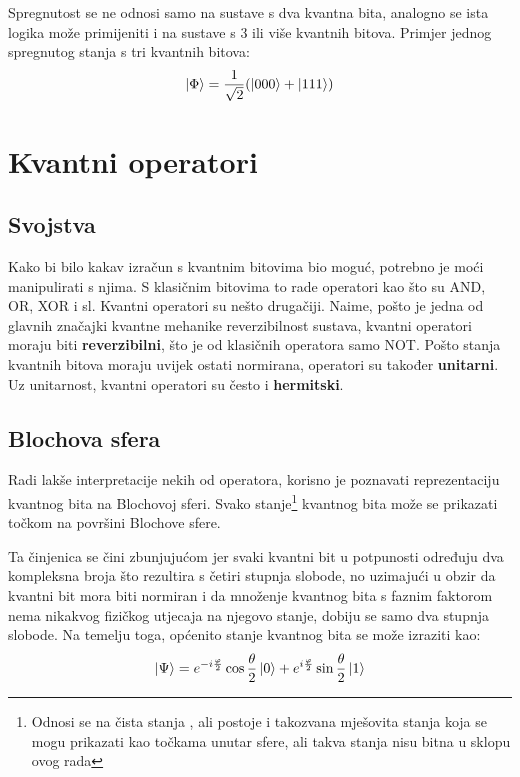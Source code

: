 Spregnutost se ne odnosi samo na sustave s dva kvantna bita, analogno se ista logika može primijeniti i na sustave s 3 ili više kvantnih bitova. Primjer jednog spregnutog stanja s tri kvantnih bitova:
\[
\ket{\Phi} = \frac{1}{\sqrt{2}}(\ket{000} + \ket{111})
\]




\section{Kvantni operatori}

\subsection{Svojstva}

Kako bi bilo kakav izračun s kvantnim bitovima bio moguć, potrebno je moći manipulirati s njima. S klasičnim bitovima to rade operatori kao što su AND, OR, XOR i sl. Kvantni operatori su nešto drugačiji. Naime, pošto je jedna od glavnih značajki kvantne mehanike reverzibilnost sustava, kvantni operatori moraju biti \textbf{reverzibilni}, što je od klasičnih operatora samo NOT. Pošto stanja kvantnih bitova moraju uvijek ostati normirana, operatori su također \textbf{unitarni}. Uz unitarnost, kvantni operatori su često i \textbf{hermitski}.

\subsection{Blochova sfera}

Radi lakše interpretacije nekih od operatora, korisno je poznavati reprezentaciju kvantnog bita na Blochovoj sferi. Svako stanje\footnote{Odnosi se na čista stanja , ali postoje i takozvana mješovita stanja koja se mogu prikazati kao točkama unutar sfere, ali takva stanja nisu bitna u sklopu ovog rada} kvantnog bita može se prikazati točkom na površini Blochove sfere.

Ta činjenica se čini zbunjujućom jer svaki kvantni bit u potpunosti određuju dva kompleksna broja što rezultira s četiri stupnja slobode, no uzimajući u obzir da kvantni bit mora biti normiran i da množenje kvantnog bita s faznim faktorom nema nikakvog fizičkog utjecaja na njegovo stanje, dobiju se samo dva stupnja slobode. Na temelju toga, općenito stanje kvantnog bita se može izraziti kao:
\[
\ket{\Psi} = e^{-i\frac{\varphi}{2}}\cos\frac{\theta}{2}\ket{0} + e^{i\frac{\varphi}{2}}\sin\frac{\theta}{2}\ket{1}
\]

